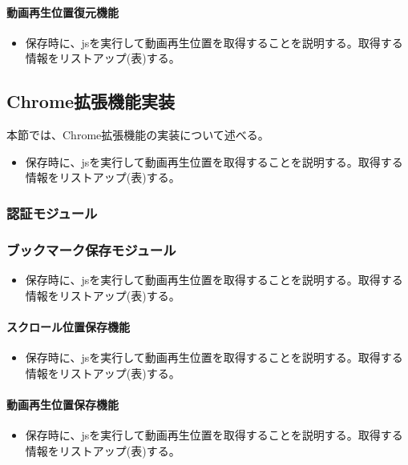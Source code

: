 \paragraph{動画再生位置復元機能}
\begin{itemize}
  \item 保存時に、jsを実行して動画再生位置を取得することを説明する。取得する情報をリストアップ(表)する。
\end{itemize}

\subsection{Chrome拡張機能実装}
本節では、Chrome拡張機能の実装について述べる。
\begin{itemize}
  \item 保存時に、jsを実行して動画再生位置を取得することを説明する。取得する情報をリストアップ(表)する。
\end{itemize}

\subsubsection{認証モジュール}

\subsubsection{ブックマーク保存モジュール}
\begin{itemize}
  \item 保存時に、jsを実行して動画再生位置を取得することを説明する。取得する情報をリストアップ(表)する。
\end{itemize}

\paragraph{スクロール位置保存機能}
\begin{itemize}
  \item 保存時に、jsを実行して動画再生位置を取得することを説明する。取得する情報をリストアップ(表)する。
\end{itemize}

\paragraph{動画再生位置保存機能}
\begin{itemize}
  \item 保存時に、jsを実行して動画再生位置を取得することを説明する。取得する情報をリストアップ(表)する。
\end{itemize}

